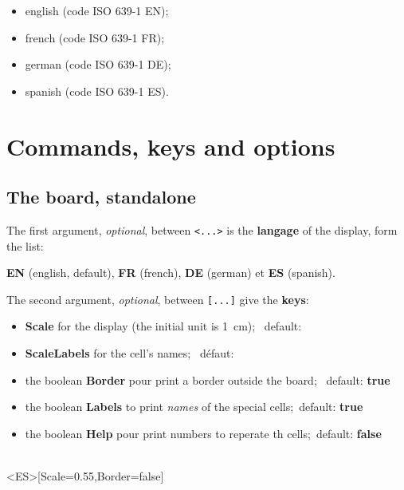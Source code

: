 \documentclass{article}
\newcommand\Cle[1]{{\bfseries\sffamily\textlangle #1\textrangle}}
\begin{document}
\begin{itemize}
	\item english (code ISO 639-1 EN);
	\item french (code ISO 639-1 FR);
	\item german (code ISO 639-1 DE);
	\item spanish (code ISO 639-1 ES).
\end{itemize}

\pagebreak

\section{Commands, keys and options}

\subsection{The board, standalone}

The first argument, \textit{optional}, between \texttt{<...>} is the \Cle{langage} of the display, form the list:

\hfill\Cle{EN} (english, default), \Cle{FR} (french), \Cle{DE} (german) et \Cle{ES} (spanish).\hfill~

\smallskip

The second argument, \textit{optional}, between \texttt{[...]} give the \Cle{keys}:

\begin{itemize}
	\item \Cle{Scale} for the display (the initial unit is 1~cm); \hfill~default: \Cle{1}
	\item \Cle{ScaleLabels} for the cell's names; \hfill~défaut: \Cle{1}
	\item the boolean \Cle{Border} pour print a border outside the board; \hfill~default: \Cle{true}
	\item the boolean \Cle{Labels} to print \textit{names} of the special cells;\hfill~default: \Cle{true}
	\item the boolean \Cle{Help} pour print numbers to reperate th cells;\hfill~default: \Cle{false}
\end{itemize}

\begin{PresentationCode}{}
\ScrabbleBoard[Labels=false,Scale=0.55]\\      %
\ScrabbleBoard<ES>[Scale=0.55,Border=false]     %
\end{PresentationCode}
\end{document}
